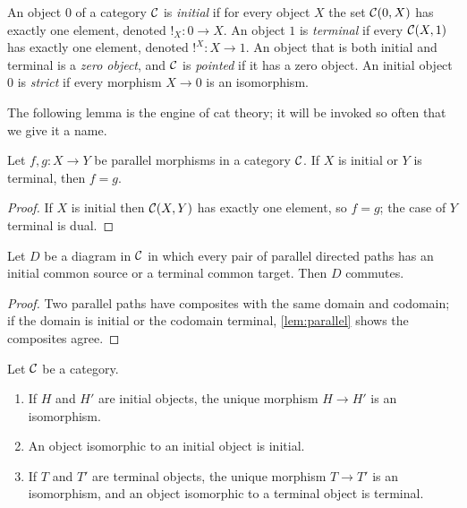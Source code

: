 \begin{definition}\label{def:initial-terminal}
An object $0$ of a category $\mathcal{C}$ is \emph{initial} if for every object $X$
the set $\mathcal{C}(0,X)$ has exactly one element, denoted $!_X\colon 0\to X$.
An object $1$ is \emph{terminal} if every $\mathcal{C}(X,1)$ has exactly one element,
denoted $!^X\colon X\to 1$. An object that is both initial and terminal is a
\emph{zero object}, and $\mathcal{C}$ is \emph{pointed} if it has a zero object. An
initial object $0$ is \emph{strict} if every morphism $X\to 0$ is an
isomorphism.
\end{definition}

The following lemma is the engine of cat theory; it will be invoked so often
that we give it a name.

\begin{lemma}\label{lem:parallel}
Let $f,g\colon X\to Y$ be parallel morphisms in a category $\mathcal{C}$. If $X$ is
initial or $Y$ is terminal, then $f=g$.
\end{lemma}

\begin{proof}
If $X$ is initial then $\mathcal{C}(X,Y)$ has exactly one element, so $f=g$; the
case of $Y$ terminal is dual.
\end{proof}

\begin{corollary}\label{cor:auto-commute}
Let $D$ be a diagram in $\mathcal{C}$ in which every pair of parallel directed paths
has an initial common source or a terminal common target. Then $D$ commutes.
\end{corollary}

\begin{proof}
Two parallel paths have composites with the same domain and codomain; if the
domain is initial or the codomain terminal, \cref{lem:parallel} shows the
composites agree.
\end{proof}

\begin{lemma}\label{lem:initial-unique}
Let $\mathcal{C}$ be a category.
\begin{enumerate}
\item If $H$ and $H'$ are initial objects, the unique morphism $H\to H'$ is an
  isomorphism.
\item An object isomorphic to an initial object is initial.
\item If $T$ and $T'$ are terminal objects, the unique morphism $T\to T'$ is
  an isomorphism, and an object isomorphic to a terminal object is terminal.
\end{enumerate}
\end{lemma}

